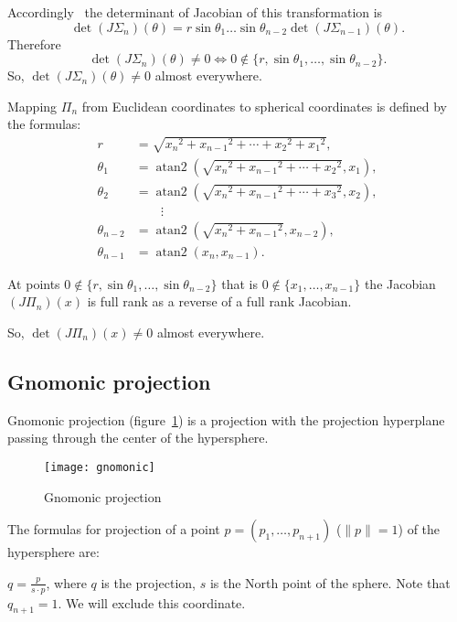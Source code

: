 \documentclass[oneside,draft]{amsart}
\newcommand{\norm}[1]{\lVert #1\rVert}
\begin{document}
Accordingly~\cite{polar-jacobian} the determinant of Jacobian of this transformation is
\[ \det (J\Sigma_n)(\theta) = r\sin\theta_1\dots\sin\theta_{n-2}\det (J\Sigma_{n-1})(\theta). \]
Therefore
\[
\det (J\Sigma_n)(\theta)\ne 0\Leftrightarrow 0\notin\{r,\sin\theta_1,\dots,\sin\theta_{n-2}\}.
\]
So, $\det (J\Sigma_n)(\theta)\ne 0$ almost everywhere.

Mapping $\Pi_n$ from Euclidean coordinates to spherical coordinates is defined by the formulas:
\[
\begin{aligned}r&={\textstyle {\sqrt {{x_{n}}^{2}+{x_{n-1}}^{2}+\cdots +{x_{2}}^{2}+{x_{1}}^{2}}}},\\\theta _{1}&=\operatorname {atan2} \left({\textstyle {\sqrt {{x_{n}}^{2}+{x_{n-1}}^{2}+\cdots +{x_{2}}^{2}}}},x_{1}\right),\\\theta _{2}&=\operatorname {atan2} \left({\textstyle {\sqrt {{x_{n}}^{2}+{x_{n-1}}^{2}+\cdots +{x_{3}}^{2}}}},x_{2}\right),\\&\qquad \vdots \\\theta _{n-2}&=\operatorname {atan2} \left({\textstyle {\sqrt {{x_{n}}^{2}+{x_{n-1}}^{2}}}},x_{n-2}\right),\\\theta _{n-1}&=\operatorname {atan2} \left(x_{n},x_{n-1}\right).\end{aligned}
\]  

At points $0\notin\{r,\sin\theta_1,\dots,\sin\theta_{n-2}\}$ that is $0\notin\{x_1,\dots,x_{n-1}\}$ the Jacobian $(J\Pi_n)(x)$
is full rank as a reverse of a full rank Jacobian.

So, $\det (J\Pi_n)(x)\ne 0$ almost everywhere.

\subsection{Gnomonic projection}

Gnomonic projection (figure~\ref{fig:gnomonic}) is a projection with the projection hyperplane passing through the center of the hypersphere.

\begin{figure}[hbt]
    \centering
    \texttt{[image: gnomonic]}
    \caption{Gnomonic projection}
    \label{fig:gnomonic}
\end{figure}

The formulas for projection of a point $p=(p_1,\dots,p_{n+1})$ ($\norm{p} = 1$) of the hypersphere are:

$q=\frac{p}{s\cdot p}$, where $q$ is the projection, $s$ is the North point of the sphere. Note that $q_{n+1}=1$. We will exclude this coordinate.
\end{document}
